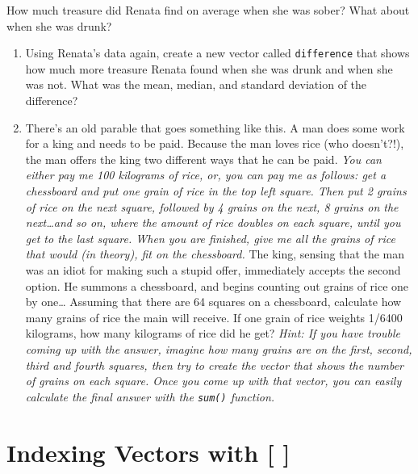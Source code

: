 \documentclass[]{book}
\theoremstyle{definition}
\theoremstyle{definition}
\theoremstyle{remark}
\begin{document}
How much treasure did Renata find on average when she was sober? What
about when she was drunk?

\begin{enumerate}
\def\labelenumi{\arabic{enumi}.}
\setcounter{enumi}{2}
\item
  Using Renata's data again, create a new vector called
  \texttt{difference} that shows how much more treasure Renata found
  when she was drunk and when she was not. What was the mean, median,
  and standard deviation of the difference?
\item
  There's an old parable that goes something like this. A man does some
  work for a king and needs to be paid. Because the man loves rice (who
  doesn't?!), the man offers the king two different ways that he can be
  paid. \emph{You can either pay me 100 kilograms of rice, or, you can
  pay me as follows: get a chessboard and put one grain of rice in the
  top left square. Then put 2 grains of rice on the next square,
  followed by 4 grains on the next, 8 grains on the next\ldots{}and so
  on, where the amount of rice doubles on each square, until you get to
  the last square. When you are finished, give me all the grains of rice
  that would (in theory), fit on the chessboard.} The king, sensing that
  the man was an idiot for making such a stupid offer, immediately
  accepts the second option. He summons a chessboard, and begins
  counting out grains of rice one by one\ldots{} Assuming that there are
  64 squares on a chessboard, calculate how many grains of rice the main
  will receive. If one grain of rice weights 1/6400 kilograms, how many
  kilograms of rice did he get? \emph{Hint: If you have trouble coming
  up with the answer, imagine how many grains are on the first, second,
  third and fourth squares, then try to create the vector that shows the
  number of grains on each square. Once you come up with that vector,
  you can easily calculate the final answer with the \texttt{sum()}
  function.}
\end{enumerate}

\chapter{Indexing Vectors with {[} {]}}\label{vectorindexing}
\end{document}
